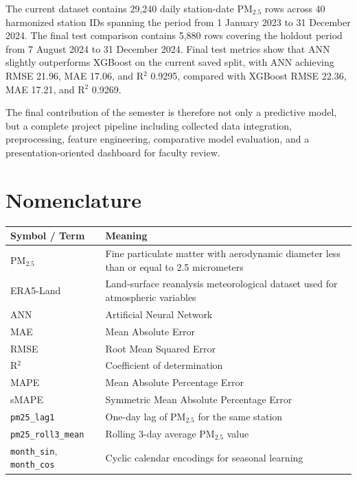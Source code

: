\documentclass[12pt,a4paper]{report}
\begin{document}
The current dataset contains 29,240 daily station-date PM$_{2.5}$ rows across 40 harmonized station IDs spanning the period from 1 January 2023 to 31 December 2024. The final test comparison contains 5,880 rows covering the holdout period from 7 August 2024 to 31 December 2024. Final test metrics show that ANN slightly outperforms XGBoost on the current saved split, with ANN achieving RMSE 21.96, MAE 17.06, and R$^2$ 0.9295, compared with XGBoost RMSE 22.36, MAE 17.21, and R$^2$ 0.9269.

The final contribution of the semester is therefore not only a predictive model, but a complete project pipeline including collected data integration, preprocessing, feature engineering, comparative model evaluation, and a presentation-oriented dashboard for faculty review.

\tableofcontents
\listoffigures
\listoftables
\clearpage

\chapter*{Nomenclature}
\begin{longtable}{L{2.5cm}L{11cm}}
\toprule
\textbf{Symbol / Term} & \textbf{Meaning} \\
\midrule
PM$_{2.5}$ & Fine particulate matter with aerodynamic diameter less than or equal to 2.5 micrometers \\
ERA5-Land & Land-surface reanalysis meteorological dataset used for atmospheric variables \\
ANN & Artificial Neural Network \\
MAE & Mean Absolute Error \\
RMSE & Root Mean Squared Error \\
R$^2$ & Coefficient of determination \\
MAPE & Mean Absolute Percentage Error \\
sMAPE & Symmetric Mean Absolute Percentage Error \\
\texttt{pm25\_lag1} & One-day lag of PM$_{2.5}$ for the same station \\
\texttt{pm25\_roll3\_mean} & Rolling 3-day average PM$_{2.5}$ value \\
\texttt{month\_sin}, \texttt{month\_cos} & Cyclic calendar encodings for seasonal learning \\
\bottomrule
\end{longtable}

\clearpage
{}
\end{document}
